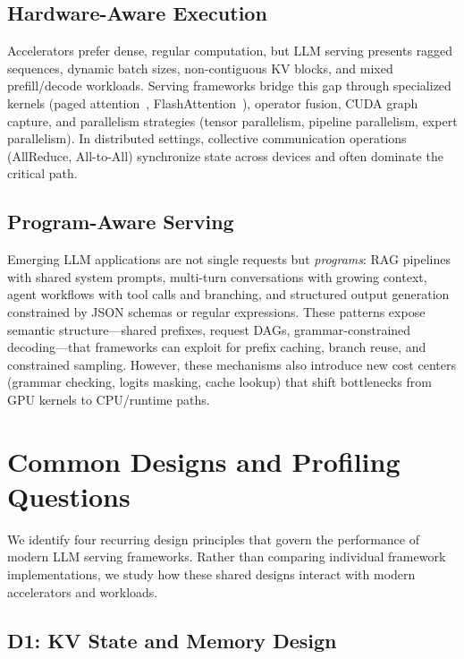 \documentclass[conference]{IEEEtran}
\begin{document}
\subsection{Hardware-Aware Execution}

Accelerators prefer dense, regular computation, but LLM serving presents ragged
sequences, dynamic batch sizes, non-contiguous KV blocks, and mixed
prefill/decode workloads. Serving frameworks bridge this gap through specialized
kernels (paged attention~\cite{vllm}, FlashAttention~\cite{flashattn}), operator
fusion, CUDA graph capture, and parallelism strategies (tensor parallelism,
pipeline parallelism, expert parallelism). In distributed settings, collective
communication operations (AllReduce, All-to-All) synchronize state across
devices and often dominate the critical path.

\subsection{Program-Aware Serving}

Emerging LLM applications are not single requests but \emph{programs}: RAG
pipelines with shared system prompts, multi-turn conversations with growing
context, agent workflows with tool calls and branching, and structured output
generation constrained by JSON schemas or regular expressions. These patterns
expose semantic structure---shared prefixes, request DAGs, grammar-constrained
decoding---that frameworks can exploit for prefix caching, branch reuse, and
constrained sampling. However, these mechanisms also introduce new cost centers
(grammar checking, logits masking, cache lookup) that shift bottlenecks from
GPU kernels to CPU/runtime paths.


\section{Common Designs and Profiling Questions}
\label{sec:common-designs}

We identify four recurring design principles that govern the performance of
modern LLM serving frameworks. Rather than comparing individual framework
implementations, we study how these shared designs interact with modern
accelerators and workloads.

\subsection{D1: KV State and Memory Design}
\end{document}

